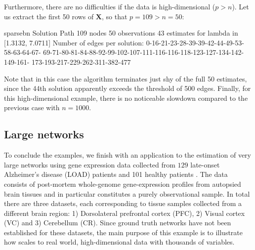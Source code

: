 \documentclass[article]{jss}
\newcommand{\samplemat}{\mathbf{X}}
\renewcommand{\|}{\,|\,}
\begin{document}
Furthermore, there are no difficulties if the data is high-dimensional ($p>n$). Let us extract the first 50 rows of $\samplemat$, so that $p=109>n=50$:
%
\begin{CodeChunk}
\begin{CodeOutput}                          
sparsebn Solution Path
 109 nodes
 50 observations
 43 estimates for lambda in [1.3132, 7.0711]
 Number of edges per solution: 0-16-21-23-28-39-39-42-44-49-53-58-63-64-67-
 69-71-80-81-84-88-92-99-102-107-111-116-116-118-123-127-134-142-149-161-
 173-193-217-229-262-311-382-477
\end{CodeOutput}
\end{CodeChunk}
%
Note that in this case the algorithm terminates just shy of the full 50 estimates, since the 44th solution apparently exceeds the threshold of 500 edges. Finally, for this high-dimensional example, there is no noticeable slowdown compared to the previous case with $n=1000$.

\subsection{Large networks}

To conclude the examples, we finish with an application to the estimation of very large networks using gene expression data collected from $129$ late-onset Alzheimer's disease (LOAD) patients and 101 healthy patients \citep{zhang2013}. The data consists of post-mortem whole-genome gene-expression profiles from autopsied brain tissues and in particular constitutes a purely observational sample. In total there are three datasets, each corresponding to tissue samples collected from a different brain region: 1) Dorsolateral prefrontal cortex (PFC), 2) Visual cortex (VC) and 3) Cerebellum (CR). Since ground truth networks have not been established for these datasets, the main purpose of this example is to illustrate how  scales to real world, high-dimensional data with thousands of variables. 
\end{document}
